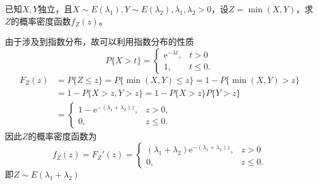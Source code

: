 \begin{example}
    已知$X,Y$独立，且$X\sim E(\lambda_1), Y\sim E(\lambda_2), \lambda_1,\lambda_2>0$，设$Z=\min(X,Y)$，求$Z$的概率密度函数$f_Z(z)$。
\end{example}
\begin{solution}
    由于涉及到指数分布，故可以利用指数分布的性质
    \[
        P\{X>t\} =
        \begin{cases}
            \mathrm{e}^{-\lambda t}, & t>0      \\
            1,                       & t\leq 0.
        \end{cases}
    \]
    \begin{align*}
        F_Z(z) & = P\{Z\leq z\} = P\{ \min(X,Y)\leq z \} = 1 - P\{\min(X,Y) > z\} \\
               & =1 - P\{X>z, Y>z\} = 1-P\{X>z\}P\{Y>z\}                          \\
               & =
        \begin{cases}
            1-\mathrm{e}^{-(\lambda_1+\lambda_2)z} , & z>0,     \\
            0,                                       & z\leq 0.
        \end{cases}
    \end{align*}
    因此$Z$的概率密度函数为
    \[
        f_Z(z) = F_Z'(z) =
        \begin{cases}
            (\lambda_1+\lambda_2)\mathrm{e}^{-(\lambda_1+\lambda_2)z}, & z>0      \\
            0,                                                         & z\leq 0.
        \end{cases}
    \]
    即$Z\sim E(\lambda_1+\lambda_2)$
\end{solution}

